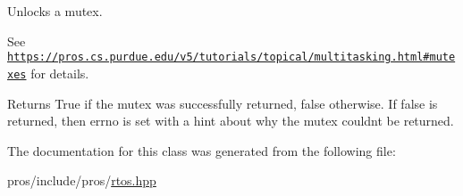 Unlocks a mutex. 

See \href{https://pros.cs.purdue.edu/v5/tutorials/topical/multitasking.html#mutexes}{\tt https\+://pros.\+cs.\+purdue.\+edu/v5/tutorials/topical/multitasking.\+html\#mutexes} for details.

\begin{DoxyReturn}{Returns}
True if the mutex was successfully returned, false otherwise. If false is returned, then errno is set with a hint about why the mutex couldn\textquotesingle{}t be returned. 
\end{DoxyReturn}


The documentation for this class was generated from the following file\+:\begin{DoxyCompactItemize}
\item 
pros/include/pros/\hyperlink{rtos_8hpp}{rtos.\+hpp}\end{DoxyCompactItemize}
